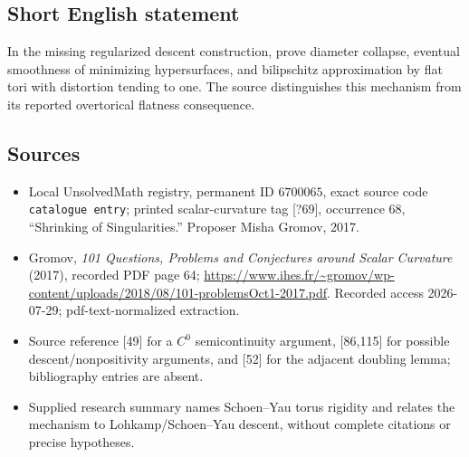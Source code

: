 \documentclass[11pt]{article}
\begin{document}
\subsection{Short English statement}
In the missing regularized descent construction, prove diameter collapse, eventual smoothness of minimizing hypersurfaces, and bilipschitz approximation by flat tori with distortion tending to one. The source distinguishes this mechanism from its reported overtorical flatness consequence.
\subsection{Sources}
\begin{itemize}
\item Local UnsolvedMath registry, permanent ID \(6700065\), exact source code \texttt{catalogue entry}; printed scalar-curvature tag [?69], occurrence 68, ``Shrinking of Singularities.'' Proposer Misha Gromov, 2017.
\item Gromov, \emph{101 Questions, Problems and Conjectures around Scalar Curvature} (2017), recorded PDF page 64; \url{https://www.ihes.fr/~gromov/wp-content/uploads/2018/08/101-problemsOct1-2017.pdf}. Recorded access 2026-07-29; pdf-text-normalized extraction.
\item Source reference [49] for a \(C^0\) semicontinuity argument, [86,115] for possible descent/nonpositivity arguments, and [52] for the adjacent doubling lemma; bibliography entries are absent.
\item Supplied research summary names Schoen--Yau torus rigidity and relates the mechanism to Lohkamp/Schoen--Yau descent, without complete citations or precise hypotheses.
\end{itemize}
\end{document}
